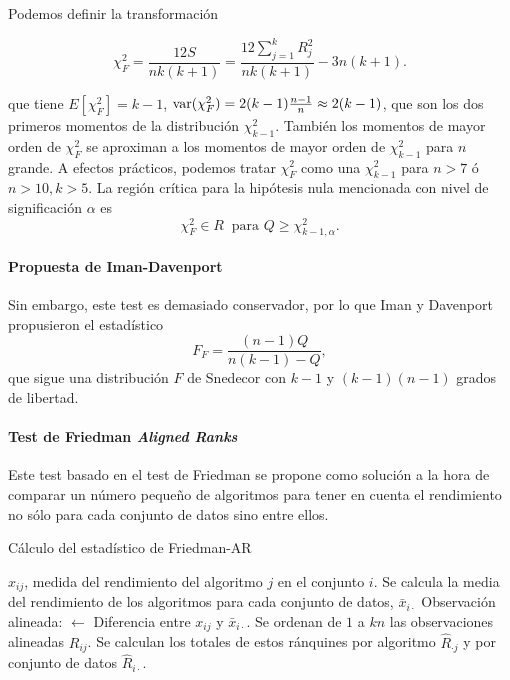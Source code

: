 	Podemos definir la transformación
	
	\[ \chi^2_F = \frac{12S}{nk(k+1)} = 
	\frac{12 \sum\limits_{j=1}^k R_j^2}{nk(k+1)} -3n(k+1) .
	\]
	
	que tiene $E[\chi^2_F] = k-1$, $\text{var}(\chi^2_F)= 2(k-1)
\frac{n-1}{n} \approx 2(k-1)$, que son los dos primeros 
momentos de la distribución $\chi^2_{k-1}$. También los 
momentos de mayor orden de $\chi^2_F$ se aproximan a los 
momentos de mayor orden de $\chi^2_{k-1}$ para $n$ grande. A 
efectos prácticos, podemos tratar $\chi^2_F$ como una $
\chi^2_{k-1}$ para $n>7$ ó $n>10, k>5$. La región crítica 
para la hipótesis nula mencionada con nivel de significación 
$\alpha$ es
	\[ 
		\chi^2_F \in R \ \text{ para } 
			Q \geq \chi_{k-1,\alpha}^2 .
	\]
	
\paragraph{Propuesta de Iman-Davenport} Sin embargo, este
test es demasiado conservador, por lo que Iman y Davenport
propusieron el estadístico
	\[
		F_F = \frac{(n-1)Q}{n(k-1) - Q},
	\]
	que sigue una distribución $F$ de Snedecor con $k-1$ y
$(k-1)(n-1)$ grados de libertad.
	
	
\paragraph{Test de Friedman \textit{Aligned Ranks}}
	Este test basado en el test de Friedman se propone como
solución a la hora de comparar un número pequeño de 
algoritmos para tener en cuenta el rendimiento no sólo 
para cada conjunto de datos sino entre ellos.\\
	
\begin{algorithm}
	\caption{Cálculo del estadístico de Friedman-AR}
	\label{alg:Friedman-AR}
	\begin{algorithmic}[1]
	\REQUIRE $x_{ij}$, medida del rendimiento del
			algoritmo $j$ en el conjunto $i$.
	\STATE Se calcula la media del rendimiento de los 
		algoritmos para cada conjunto de datos, 
		$\bar{x}_{i \cdot}$
		\STATE Observación alineada: $\leftarrow$
			Diferencia entre $x_{ij}$ y $\bar{x}_{i \cdot}$.	
	\ENDFOR
	\STATE Se ordenan de $1$ a $kn$ las observaciones 
		alineadas $R_{ij}$.
	\STATE Se calculan los totales de estos ránquines
		por algoritmo $\hat{R}_{\cdot j}$ y por
		conjunto de datos $\hat{R}_{i \cdot}$.
	\end{algorithmic}
\end{algorithm} 

